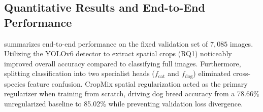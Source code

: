 \begin{table}[h]
  \centering
  \caption{Controlled baselines and ablation configurations. Each row isolates a single variable.}
  \label{tab:ablations}
\end{table}

\subsection{Quantitative Results and End-to-End Performance}
\label{subsec:quantitative_results}

 summarizes end-to-end performance on the fixed validation set of $7,085$ images. Utilizing the YOLOv6 detector \cite{li2022yolov6} to extract spatial crops (RQ1) noticeably improved overall accuracy compared to classifying full images. Furthermore, splitting classification into two specialist heads ($f_{\text{cat}}$ and $f_{\text{dog}}$) eliminated cross-species feature confusion. CropMix spatial regularization \cite{yun2019cutmix} acted as the primary regularizer when training from scratch, driving dog breed accuracy from a 78.66\% unregularized baseline to 85.02\% while preventing validation loss divergence.

